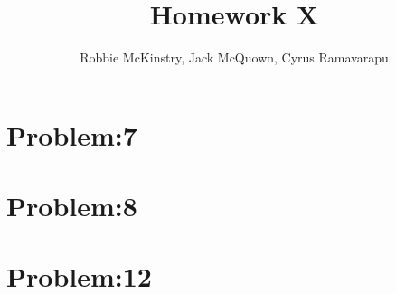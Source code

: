 \documentclass[12pt]{article}
\begin{document}
\title{Homework X}
\author{Robbie McKinstry, Jack McQuown, Cyrus Ramavarapu}
\renewcommand{\today}{7 October 2016}
\renewcommand{\baselinestretch}{1.5}
\maketitle

\section*{Problem:7}
\section*{Problem:8}
\section*{Problem:12}
\end{document}
